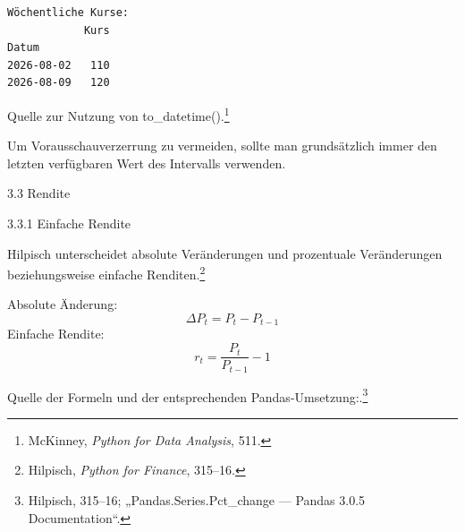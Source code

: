 \documentclass[
  ngerman,
  a4paper,
  DIV=11,
  oneside]{scrreprt}
\begin{document}
\begin{verbatim}
Wöchentliche Kurse:
            Kurs
Datum           
2026-08-02   110
2026-08-09   120
\end{verbatim}

Quelle zur Nutzung von to\_datetime().\footnote{McKinney, \emph{Python
  for Data Analysis}, 511.}

Um Vorausschauverzerrung zu vermeiden, sollte man grundsätzlich immer
den letzten verfügbaren Wert des Intervalls verwenden.

3.3 Rendite

3.3.1 Einfache Rendite

Hilpisch unterscheidet absolute Veränderungen und prozentuale
Veränderungen beziehungsweise einfache Renditen.\footnote{Hilpisch,
  \emph{Python for Finance}, 315--16.}

Absolute Änderung: \[
\Delta P_t=P_t-P_{t-1}
\] Einfache Rendite: \[
r_t=\frac{P_t}{P_{t-1}}-1
\]

Quelle der Formeln und der entsprechenden Pandas-Umsetzung:.\footnote{Hilpisch,
  315--16; {„Pandas.{Series}.Pct\_change --- Pandas 3.0.5
  Documentation``}.}
\end{document}
